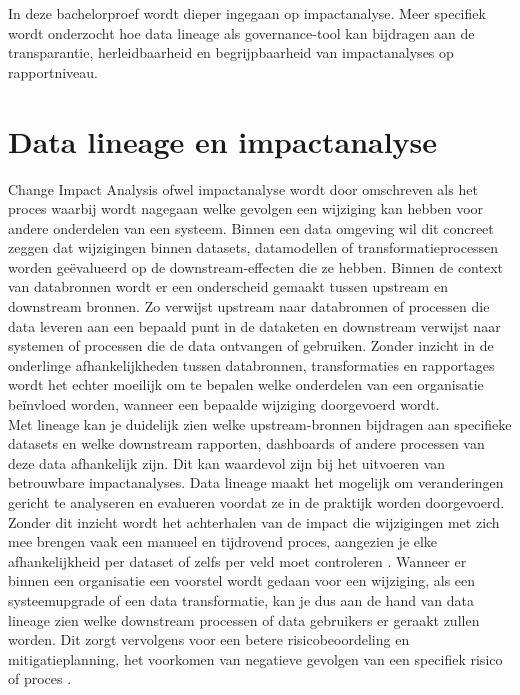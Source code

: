 In deze bachelorproef wordt dieper ingegaan op impactanalyse. Meer specifiek wordt onderzocht hoe data lineage als governance-tool kan bijdragen aan de transparantie, herleidbaarheid en begrijpbaarheid van impactanalyses op rapportniveau.\\

\section{Data lineage en impactanalyse}

Change Impact Analysis ofwel impactanalyse wordt door \textcite{kretsou2021change} omschreven als het proces waarbij wordt nagegaan welke gevolgen een wijziging kan hebben voor andere onderdelen van een systeem. Binnen een data omgeving wil dit concreet zeggen dat wijzigingen binnen datasets, datamodellen of transformatieprocessen worden geëvalueerd op de downstream-effecten die ze hebben. Binnen de context van databronnen wordt er een onderscheid gemaakt tussen upstream en downstream bronnen. Zo verwijst upstream naar databronnen of processen die data leveren aan een bepaald punt in de dataketen en downstream verwijst naar systemen of processen die de data ontvangen of gebruiken. Zonder inzicht in de onderlinge afhankelijkheden tussen databronnen, transformaties en rapportages wordt het echter moeilijk om te bepalen welke onderdelen van een organisatie beïnvloed worden, wanneer een bepaalde wijziging doorgevoerd wordt.\\

Met lineage kan je duidelijk zien welke upstream-bronnen bijdragen aan specifieke datasets en welke downstream rapporten, dashboards of andere processen van deze data afhankelijk zijn. Dit kan waardevol zijn bij het uitvoeren van betrouwbare impactanalyses. Data lineage maakt het mogelijk om veranderingen gericht te analyseren en evalueren voordat ze in de praktijk worden doorgevoerd. Zonder dit inzicht wordt het achterhalen van de impact die wijzigingen met zich mee brengen vaak een manueel en tijdrovend proces, aangezien je elke afhankelijkheid per dataset of zelfs per veld moet controleren \autocite{malviya2025dbt}. Wanneer er binnen een organisatie een voorstel wordt gedaan voor een wijziging, als een systeemupgrade of een data transformatie, kan je dus aan de hand van data lineage zien welke downstream processen of data gebruikers er geraakt zullen worden. Dit zorgt vervolgens voor een betere risicobeoordeling en mitigatieplanning, het voorkomen van negatieve gevolgen van een specifiek risico of proces \autocite{verma2024tracing}.\\

